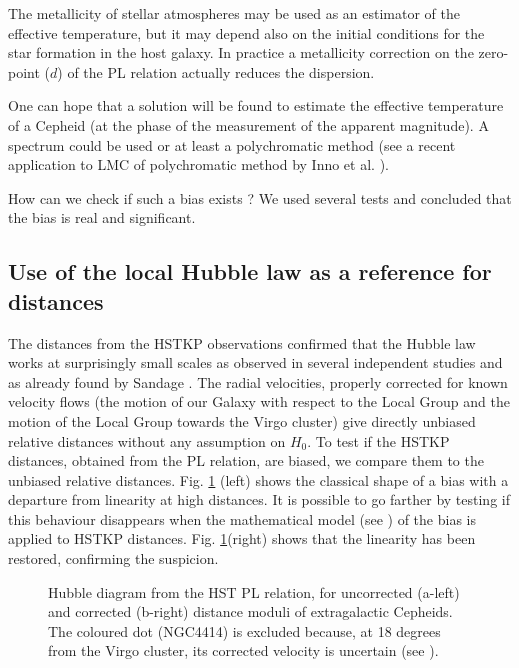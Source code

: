 The metallicity of stellar atmospheres may be used as an estimator of the effective temperature, but it may depend also on the initial conditions for the star formation in the host galaxy.  In practice a metallicity correction on  the zero-point ($d$) of the PL relation actually reduces the dispersion.

One can hope that a solution will be found to estimate the effective temperature of a Cepheid (at the phase of the measurement of the apparent magnitude). A spectrum could be used or at least a polychromatic method (see a recent application to LMC of polychromatic method by Inno et al. \cite{inno}).

 How can we check if such a bias exists ? We used several tests and concluded that the bias is real and significant.




\subsection{ Use of the local Hubble law as a reference for distances  }
\label{sec3.2}
The distances from the HSTKP observations confirmed that the Hubble law works at surprisingly small scales as observed in several independent studies \cite{disphl,Ref25} and as already found by Sandage  \cite{Ref26}.   The radial velocities, properly corrected for known velocity flows (the motion of our Galaxy with respect to the Local Group and the motion of the Local Group towards the Virgo cluster) give directly unbiased relative distances without any assumption on $H_0$. 
To test if the HSTKP distances, obtained from the PL relation, are biased, we compare them to the unbiased relative distances.
Fig. \ref{hstpl} (left) shows the classical shape of a bias with a departure from linearity at high distances.
It is possible to go  farther by testing if  this behaviour disappears when the mathematical model  (see \cite{bias}) of the bias is applied to HSTKP distances.   Fig. \ref{hstpl}(right) shows that the linearity has been restored, confirming the suspicion.
\begin{figure}
\caption{  Hubble diagram from the HST PL relation, for uncorrected (a-left) and corrected (b-right) distance moduli  of extragalactic Cepheids. The coloured dot (NGC4414) is excluded because, at 18 degrees from the Virgo cluster, its corrected velocity is uncertain (see \cite{Ref23}). }
\label{hstpl} 
\end{figure}   

